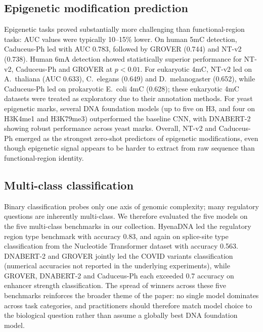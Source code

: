 \documentclass[11pt,a4paper]{article}
\begin{document}
\subsection{Epigenetic modification prediction}
Epigenetic tasks proved substantially more challenging than functional-region tasks: AUC values were typically 10--15\% lower. On human 5mC detection, Caduceus-Ph led with AUC 0.783, followed by GROVER (0.744) and NT-v2 (0.738). Human 6mA detection showed statistically superior performance for NT-v2, Caduceus-Ph and GROVER at $p < 0.01$. For eukaryotic 4mC, NT-v2 led on A.~thaliana (AUC 0.633), C.~elegans (0.649) and D.~melanogaster (0.652), while Caduceus-Ph led on prokaryotic E.~coli 4mC (0.628); these eukaryotic 4mC datasets were treated as exploratory due to their annotation methods. For yeast epigenetic marks, several DNA foundation models (up to five on H3, and four on H3K4me1 and H3K79me3) outperformed the baseline CNN, with DNABERT-2 showing robust performance across yeast marks. Overall, NT-v2 and Caduceus-Ph emerged as the strongest zero-shot predictors of epigenetic modifications, even though epigenetic signal appears to be harder to extract from raw sequence than functional-region identity.

\subsection{Multi-class classification}
Binary classification probes only one axis of genomic complexity; many regulatory questions are inherently multi-class. We therefore evaluated the five models on the five multi-class benchmarks in our collection. HyenaDNA led the regulatory region type benchmark with accuracy 0.83, and again on splice-site type classification from the Nucleotide Transformer dataset with accuracy 0.563. DNABERT-2 and GROVER jointly led the COVID variants classification (numerical accuracies not reported in the underlying experiments), while GROVER, DNABERT-2 and Caduceus-Ph each exceeded 0.7 accuracy on enhancer strength classification. The spread of winners across these five benchmarks reinforces the broader theme of the paper: no single model dominates across task categories, and practitioners should therefore match model choice to the biological question rather than assume a globally best DNA foundation model.
\end{document}
